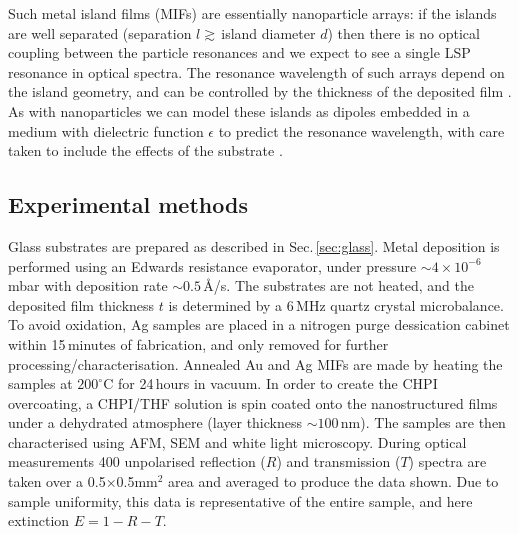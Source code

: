 Such metal island films (MIFs) are essentially nanoparticle arrays: if the islands are well separated (separation $l \gtrsim\,	$island diameter $d$) then there is no optical coupling between the particle resonances and we expect to see a single LSP resonance in optical spectra. The resonance wavelength of such arrays depend on the island geometry, and can be controlled by the thickness of the deposited film \cite{Walter2006, Sennett1950, Gupta2002, Gadenne2002, Lee1992}. As with nanoparticles we can model these islands as dipoles embedded in a medium with dielectric function $\epsilon$ to predict the resonance wavelength, with care taken to include the effects of the substrate \cite{Yamaguchi1960, Yamaguchi1972, Yamaguchi1973, Doremus1966}.

\subsection{Experimental methods}
Glass substrates are prepared as described in Sec.\,\ref{sec:glass}. Metal deposition is performed using an Edwards resistance evaporator, under pressure $\sim4\times10^{-6}$\,mbar with deposition rate $\sim0.5$\,\AA/s. The substrates are not heated, and the deposited film thickness $t$ is determined by a 6\,MHz quartz crystal microbalance. To avoid oxidation, Ag samples are placed in a nitrogen purge dessication cabinet within 15\,minutes of fabrication, and only removed for further processing/characterisation. Annealed Au and Ag MIFs are made by heating the samples at $200^{\circ}$C for 24\,hours in vacuum. In order to create the CHPI overcoating, a CHPI/THF solution is spin coated onto the nanostructured films under a dehydrated atmosphere (layer thickness $\sim100$\,nm). The samples are then characterised using AFM, SEM and white light microscopy. During optical measurements 400 unpolarised reflection ($R$) and transmission ($T$) spectra are taken over a 0.5$\times$0.5mm$^{2}$ area and averaged to produce the data shown. Due to sample uniformity, this data is representative of the entire sample, and here extinction $E=1-R-T$.

